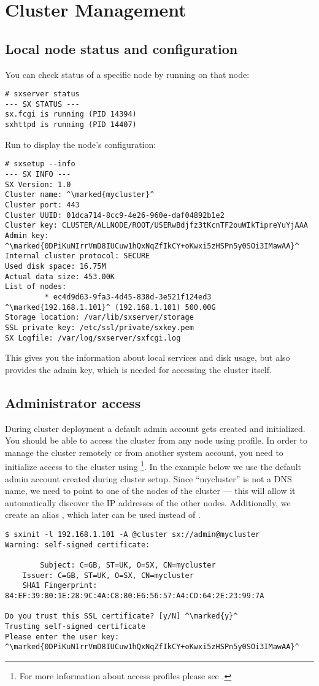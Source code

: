 \chapter{Cluster Management}

\section{Local node status and configuration}
You can check status of a specific node by running  on
that node:
\begin{lstlisting}
# sxserver status
--- SX STATUS ---
sx.fcgi is running (PID 14394)
sxhttpd is running (PID 14407)
\end{lstlisting}
Run  to display the node's configuration:
\begin{lstlisting}
# sxsetup --info
--- SX INFO ---
SX Version: 1.0
Cluster name: ^\marked{mycluster}^
Cluster port: 443
Cluster UUID: 01dca714-8cc9-4e26-960e-daf04892b1e2
Cluster key: CLUSTER/ALLNODE/ROOT/USERwBdjfz3tKcnTF2ouWIkTipreYuYjAAA
Admin key: ^\marked{0DPiKuNIrrVmD8IUCuw1hQxNqZfIkCY+oKwxi5zHSPn5y0SOi3IMawAA}^
Internal cluster protocol: SECURE
Used disk space: 16.75M
Actual data size: 453.00K
List of nodes:
         * ec4d9d63-9fa3-4d45-838d-3e521f124ed3 ^\marked{192.168.1.101}^ (192.168.1.101) 500.00G
Storage location: /var/lib/sxserver/storage
SSL private key: /etc/ssl/private/sxkey.pem
SX Logfile: /var/log/sxserver/sxfcgi.log
\end{lstlisting}
This gives you the information about local services and disk usage, but
also provides the admin key, which is needed for accessing the cluster
itself.

\section{Administrator access}
During cluster deployment a default admin account gets created
and initialized. You should be able to access the cluster from
any node using  profile. In order
to manage the cluster remotely or from another system account,
you need to initialize access to the cluster using 
\footnote{For more information about access profiles please see
.}. 
In the example below we use the default admin account created
during cluster setup. Since ``mycluster'' is not a DNS name, we need
to point  to one of the nodes of the cluster --- this will
allow it automatically discover the IP addresses of the other nodes.
Additionally, we create an alias , which later
can be used instead of .
\begin{lstlisting}
$ sxinit -l 192.168.1.101 -A @cluster sx://admin@mycluster
Warning: self-signed certificate:

        Subject: C=GB, ST=UK, O=SX, CN=mycluster
	Issuer: C=GB, ST=UK, O=SX, CN=mycluster
	SHA1 Fingerprint: 84:EF:39:80:1E:28:9C:4A:C8:80:E6:56:57:A4:CD:64:2E:23:99:7A

Do you trust this SSL certificate? [y/N] ^\marked{y}^
Trusting self-signed certificate
Please enter the user key: ^\marked{0DPiKuNIrrVmD8IUCuw1hQxNqZfIkCY+oKwxi5zHSPn5y0SOi3IMawAA}^
\end{lstlisting}


